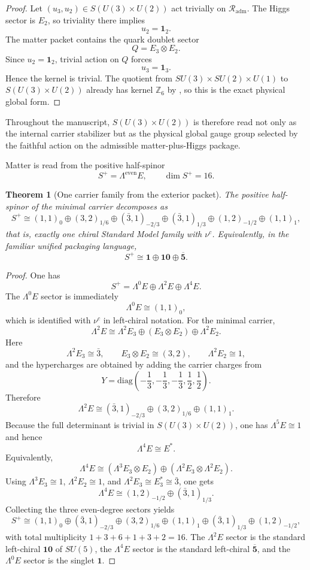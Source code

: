 \documentclass[11pt,a4paper]{article}
\newtheorem{theorem}{Theorem}[section]
\theoremstyle{definition}
\theoremstyle{remark}
\begin{document}
\begin{proof}
Let $(u_3,u_2)\in S(U(3)\times U(2))$ act trivially on $\mathcal R_{\mathrm{adm}}$. The Higgs
sector is $E_2$, so triviality there implies
\[
u_2=\mathbf 1_2.
\]
The matter packet contains the quark doublet sector
\[
Q=E_3\otimes E_2.
\]
Since $u_2=\mathbf 1_2$, trivial action on $Q$ forces
\[
u_3=\mathbf 1_3.
\]
Hence the kernel is trivial. The quotient from $SU(3)\times SU(2)\times U(1)$ to
$S(U(3)\times U(2))$ already has kernel $\mathbb Z_6$ by , so this is
the exact physical global form.
\end{proof}

Throughout the manuscript, $S(U(3)\times U(2))$ is therefore read not only as the internal carrier
stabilizer but as the physical global gauge group selected by the faithful action on the admissible
matter-plus-Higgs package.

Matter is read from the positive half-spinor
\[
S^+=\Lambda^{\mathrm{even}}E,
\qquad
\dim S^+=16.
\]

\begin{theorem}[One carrier family from the exterior packet]
The positive half-spinor of the minimal carrier decomposes as
\[
S^+
\cong
(1,1)_0\oplus(3,2)_{1/6}\oplus(\bar 3,1)_{-2/3}\oplus(\bar 3,1)_{1/3}\oplus(1,2)_{-1/2}\oplus(1,1)_1,
\]
that is, exactly one chiral Standard Model family with $\nu^c$. Equivalently, in the familiar unified packaging language,
\[
S^+\cong \mathbf 1\oplus \mathbf{10}\oplus \overline{\mathbf 5}.
\]
\end{theorem}

\begin{proof}
One has
\[
S^+=\Lambda^0E\oplus\Lambda^2E\oplus\Lambda^4E.
\]
The $\Lambda^0E$ sector is immediately
\[
\Lambda^0E\cong (1,1)_0,
\]
which is identified with $\nu^c$ in left-chiral notation. For the minimal carrier,
\[
\Lambda^2E
\cong
\Lambda^2E_3\oplus(E_3\otimes E_2)\oplus\Lambda^2E_2.
\]
Here
\[
\Lambda^2E_3\cong \bar 3,
\qquad
E_3\otimes E_2\cong (3,2),
\qquad
\Lambda^2E_2\cong 1,
\]
and the hypercharges are obtained by adding the carrier charges from
\[
Y=\mathrm{diag}\!\left(-\frac13,-\frac13,-\frac13,\frac12,\frac12\right).
\]
Therefore
\[
\Lambda^2E
\cong
(\bar 3,1)_{-2/3}\oplus(3,2)_{1/6}\oplus(1,1)_1.
\]
Because the full determinant is trivial in $S(U(3)\times U(2))$, one has $\Lambda^5E\cong 1$ and hence
\[
\Lambda^4E\cong E^\ast.
\]
Equivalently,
\[
\Lambda^4E
\cong
(\Lambda^3E_3\otimes E_2)\oplus(\Lambda^2E_3\otimes\Lambda^2E_2).
\]
Using $\Lambda^3E_3\cong 1$, $\Lambda^2E_2\cong 1$, and $\Lambda^2E_3\cong E_3^\ast\cong\bar 3$, one gets
\[
\Lambda^4E\cong (1,2)_{-1/2}\oplus(\bar 3,1)_{1/3}.
\]
Collecting the three even-degree sectors yields
\[
S^+
\cong
(1,1)_0\oplus(\bar 3,1)_{-2/3}\oplus(3,2)_{1/6}\oplus(1,1)_1\oplus(\bar 3,1)_{1/3}\oplus(1,2)_{-1/2},
\]
with total multiplicity $1+3+6+1+3+2=16$. The $\Lambda^2E$ sector is the standard left-chiral $\mathbf{10}$ of $SU(5)$, the $\Lambda^4E$ sector is the standard left-chiral $\overline{\mathbf 5}$, and the $\Lambda^0E$ sector is the singlet $\mathbf 1$.
\end{proof}
\end{document}
